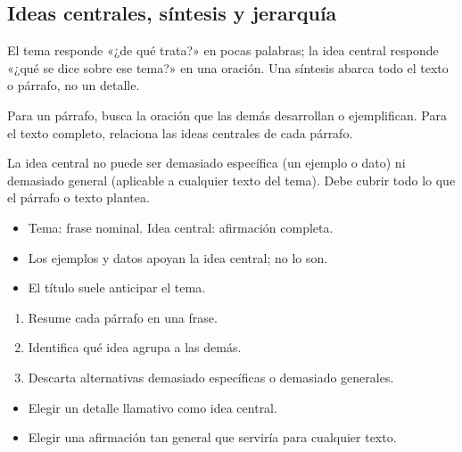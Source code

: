 \documentclass[10pt,a4paper,twocolumn]{article}
\begin{document}
\subsection{Ideas centrales, síntesis y jerarquía}

El tema responde «¿de qué trata?» en pocas palabras; la idea central responde «¿qué se dice sobre ese tema?» en una oración. Una síntesis abarca todo el texto o párrafo, no un detalle.

Para un párrafo, busca la oración que las demás desarrollan o ejemplifican. Para el texto completo, relaciona las ideas centrales de cada párrafo.

\begin{definicion}
La idea central no puede ser demasiado específica (un ejemplo o dato) ni demasiado general (aplicable a cualquier texto del tema). Debe cubrir todo lo que el párrafo o texto plantea.
\end{definicion}

\begin{ideasclave}
\begin{itemize}
  \item Tema: frase nominal. Idea central: afirmación completa.
  \item Los ejemplos y datos apoyan la idea central; no lo son.
  \item El título suele anticipar el tema.
\end{itemize}
\end{ideasclave}

\begin{metodo}
\begin{enumerate}
  \item Resume cada párrafo en una frase.
  \item Identifica qué idea agrupa a las demás.
  \item Descarta alternativas demasiado específicas o demasiado generales.
\end{enumerate}
\end{metodo}

\begin{errorfrecuente}
\begin{itemize}
  \item Elegir un detalle llamativo como idea central.
  \item Elegir una afirmación tan general que serviría para cualquier texto.
\end{itemize}
\end{errorfrecuente}
\end{document}
